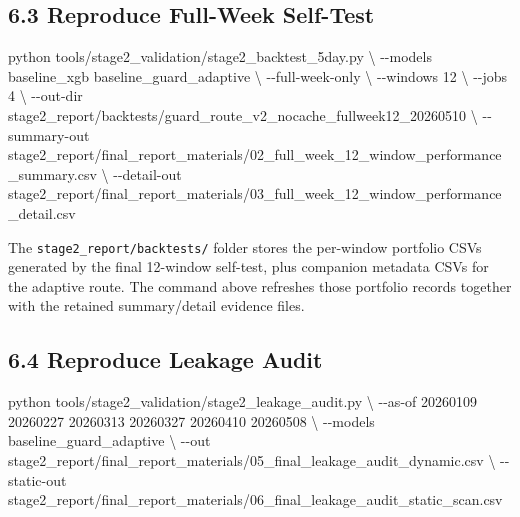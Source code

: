 \documentclass[11pt]{article}
\newenvironment{Shaded}{}{}
\newcommand{\AttributeTok}[1]{\textcolor[rgb]{0.49,0.56,0.16}{#1}}
\newcommand{\DataTypeTok}[1]{\textcolor[rgb]{0.56,0.13,0.00}{#1}}
\newcommand{\ExtensionTok}[1]{#1}
\newcommand{\NormalTok}[1]{#1}
\begin{document}
\subsection{6.3 Reproduce Full-Week
Self-Test}\label{reproduce-full-week-self-test}

\begin{Shaded}
\begin{Highlighting}[]
\ExtensionTok{python}\NormalTok{ tools/stage2\_validation/stage2\_backtest\_5day.py }\DataTypeTok{\textbackslash{}}
  \AttributeTok{{-}{-}models}\NormalTok{ baseline\_xgb baseline\_guard\_adaptive }\DataTypeTok{\textbackslash{}}
  \AttributeTok{{-}{-}full{-}week{-}only} \DataTypeTok{\textbackslash{}}
  \AttributeTok{{-}{-}windows}\NormalTok{ 12 }\DataTypeTok{\textbackslash{}}
  \AttributeTok{{-}{-}jobs}\NormalTok{ 4 }\DataTypeTok{\textbackslash{}}
  \AttributeTok{{-}{-}out{-}dir}\NormalTok{ stage2\_report/backtests/guard\_route\_v2\_nocache\_fullweek12\_20260510 }\DataTypeTok{\textbackslash{}}
  \AttributeTok{{-}{-}summary{-}out}\NormalTok{ stage2\_report/final\_report\_materials/02\_full\_week\_12\_window\_performance\_summary.csv }\DataTypeTok{\textbackslash{}}
  \AttributeTok{{-}{-}detail{-}out}\NormalTok{ stage2\_report/final\_report\_materials/03\_full\_week\_12\_window\_performance\_detail.csv}
\end{Highlighting}
\end{Shaded}

The \texttt{stage2\_report/backtests/} folder stores the per-window
portfolio CSVs generated by the final 12-window self-test, plus companion
metadata CSVs for the adaptive route. The command above refreshes those
portfolio records together with the retained summary/detail evidence files.

\subsection{6.4 Reproduce Leakage Audit}\label{reproduce-leakage-audit}

\begin{Shaded}
\begin{Highlighting}[]
\ExtensionTok{python}\NormalTok{ tools/stage2\_validation/stage2\_leakage\_audit.py }\DataTypeTok{\textbackslash{}}
  \AttributeTok{{-}{-}as{-}of}\NormalTok{ 20260109 20260227 20260313 20260327 20260410 20260508 }\DataTypeTok{\textbackslash{}}
  \AttributeTok{{-}{-}models}\NormalTok{ baseline\_guard\_adaptive }\DataTypeTok{\textbackslash{}}
  \AttributeTok{{-}{-}out}\NormalTok{ stage2\_report/final\_report\_materials/05\_final\_leakage\_audit\_dynamic.csv }\DataTypeTok{\textbackslash{}}
  \AttributeTok{{-}{-}static{-}out}\NormalTok{ stage2\_report/final\_report\_materials/06\_final\_leakage\_audit\_static\_scan.csv}
\end{Highlighting}
\end{Shaded}
\end{document}
